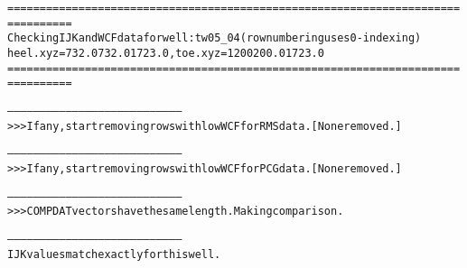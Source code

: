 \begin{alltt}
================================================================================
Checking IJK and WCF data for well: tw05_04 (row numbering uses 0-indexing)
heel.xyz = 732.0 732.0 1723.0, toe.xyz = 1200 200.0 1723.0
================================================================================

--------------------------------------------------------------------------------
>>> If any, start removing rows with low WCF for RMS data. [None removed.]

--------------------------------------------------------------------------------
>>> If any, start removing rows with low WCF for PCG data. [None removed.]

--------------------------------------------------------------------------------
>>> COMPDAT vectors have the same length. Making comparison.

--------------------------------------------------------------------------------
IJK values match exactly for this well.


\end{alltt}
